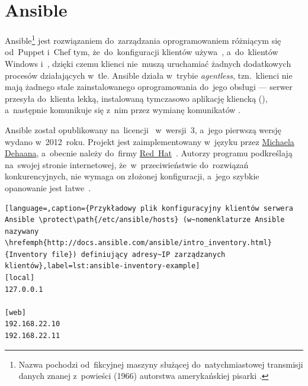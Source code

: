 \documentclass[thesis]{subfiles}
\begin{document}
\section{Ansible}
\label{sec:ansible}

Ansible\footnote{Nazwa  pochodzi od~fikcyjnej maszyny służącej do~natychmiastowej transmisji danych znanej z~powieści  (1966) autorstwa amerykańskiej pisarki .} jest rozwiązaniem do~zarządzania oprogramowaniem różniącym się od~Puppet i~Chef tym, że~do~konfiguracji klientów  używa~\ssh{}, a~do~klientów Windows  i~, dzięki czemu klienci nie~muszą uruchamiać żadnych dodatkowych procesów działających w~tle. Ansible działa w~trybie \emph{agentless}, tzn.~klienci nie mają żadnego stale zainstalowanego oprogramowania do~jego obsługi --- serwer przesyła do~klienta lekką, instalowaną tymczasowo aplikację kliencką (), a~następnie komunikuje się z~nim przez wymianę komunikatów \json{}.

Ansible został opublikowany na~licencji~ w~wersji~3, a~jego pierwszą wersję wydano w~2012~roku. Projekt jest zaimplementowany w~języku \python{} przez \href{http://michaeldehaan.net/}{\mbox{Michaela} \mbox{Dehaana}}, a~obecnie należy do~firmy \href{https://en.wikipedia.org/wiki/Red_Hat}{Red~Hat}~\cite{ansible-github}. Autorzy programu podkreślają na~swojej stronie internetowej, że~w~przeciwieństwie do~rozwiązań konkurencyjnych, nie wymaga on złożonej konfiguracji, a~jego szybkie opanowanie jest łatwe~\cite{ansible}.


\begin{lstlisting}[language=,caption={Przykładowy plik konfiguracyjny klientów serwera Ansible \protect\path{/etc/ansible/hosts} (w~nomenklaturze Ansible nazywany \hrefemph{http://docs.ansible.com/ansible/intro_inventory.html}{Inventory file}) definiujący adresy~IP zarządzanych klientów},label=lst:ansible-inventory-example]
[local]
127.0.0.1

[web]
192.168.22.10
192.168.22.11
\end{lstlisting}
\end{document}
